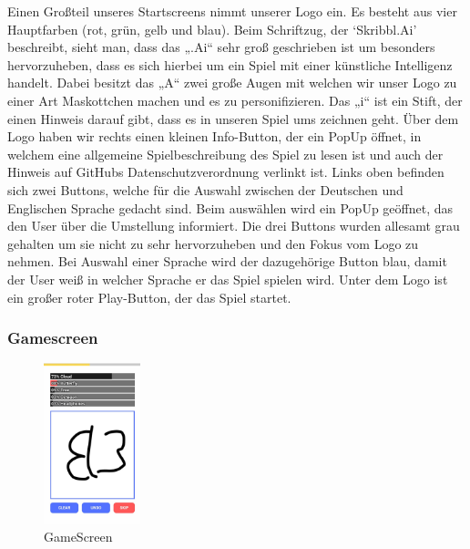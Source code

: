\documentclass[11pt]{article}
\begin{document}
Einen Großteil unseres Startscreens nimmt unserer Logo ein. Es besteht aus vier Hauptfarben (rot, grün, gelb und blau). Beim Schriftzug, der ‘Skribbl.Ai’ beschreibt, sieht man, dass das „.Ai“ sehr groß geschrieben ist um besonders hervorzuheben, dass es sich hierbei um ein Spiel mit einer künstliche Intelligenz handelt. Dabei besitzt das „A“ zwei große Augen mit welchen wir unser Logo zu einer Art Maskottchen machen und es zu personifizieren. Das „i“ ist ein Stift, der einen Hinweis darauf gibt, dass es in unseren Spiel ums zeichnen geht. 
Über dem Logo haben wir rechts einen kleinen Info-Button, der ein PopUp öffnet, in welchem eine allgemeine Spielbeschreibung des Spiel zu lesen ist und auch der Hinweis auf GitHubs Datenschutzverordnung verlinkt ist. 
Links oben befinden sich zwei Buttons, welche für die Auswahl zwischen der Deutschen und Englischen Sprache gedacht sind. 
Beim auswählen wird ein PopUp geöffnet, das den User über die Umstellung informiert. Die drei Buttons wurden allesamt grau gehalten um sie nicht zu sehr hervorzuheben und den Fokus vom Logo zu nehmen. Bei Auswahl einer Sprache wird der dazugehörige Button blau, damit der User weiß in welcher Sprache er das Spiel spielen wird. 
Unter dem Logo ist ein großer roter Play-Button, der das Spiel startet.

\subsubsection{Gamescreen}

\begin{figure}
\centering
\includegraphics[width=0.25\textwidth]{images/Gamescreen.jpg}
\caption{\label{fig:Gamescreen}GameScreen}
\end{figure}
\end{document}
